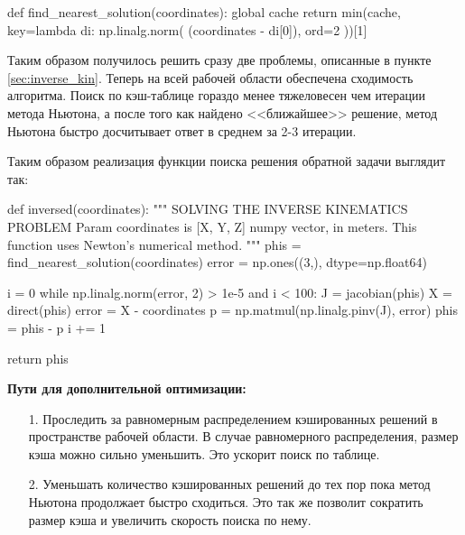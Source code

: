 \begin{python}
def find_nearest_solution(coordinates):
    global cache
    return min(cache, key=lambda di: np.linalg.norm(
        (coordinates - di[0]), 
        ord=2
    ))[1]
\end{python}

Таким образом получилось решить сразу две проблемы, описанные в пункте \ref{sec:inverse_kin}. Теперь на всей рабочей области обеспечена сходимость алгоритма. Поиск по кэш-таблице гораздо менее тяжеловесен чем итерации метода Ньютона, а после того как найдено <<ближайшее>> решение, метод Ньютона быстро досчитывает ответ в среднем за 2-3 итерации.

\noindent Таким образом реализация функции поиска решения обратной задачи выглядит так:
\begin{python}
def inversed(coordinates):
    """ 
    SOLVING THE INVERSE KINEMATICS PROBLEM \n
    Param coordinates is [X, Y, Z] numpy vector, in meters.
    This function uses Newton's numerical method.
    """
    phis = find_nearest_solution(coordinates)
    error = np.ones((3,), dtype=np.float64)

    i = 0
    while np.linalg.norm(error, 2) > 1e-5 and i < 100:
        J = jacobian(phis)
        X = direct(phis)
        error = X - coordinates
        p = np.matmul(np.linalg.pinv(J), error)
        phis = phis - p
        i += 1
    
    return phis
\end{python}

\textbf{Пути для дополнительной оптимизации:}
\begin{itemize}
    \item[1.] Проследить за равномерным распределением кэшированных решений в пространстве рабочей области. В случае равномерного распределения, размер кэша можно сильно уменьшить. Это ускорит поиск по таблице.
    \item[2.] Уменьшать количество кэшированных решений до тех пор пока метод Ньютона продолжает быстро сходиться. Это так же позволит сократить размер кэша и увеличить скорость поиска по нему.
\end{itemize}
